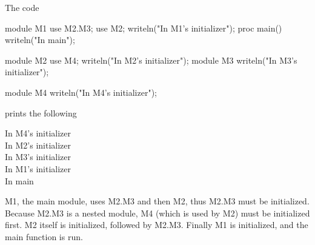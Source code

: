 \begin{example}
The code
\begin{chapelpre}
\end{chapelpre}
\begin{chapel}
module M1 {
  use M2.M3;
  use M2;
  writeln("In M1's initializer");
  proc main() {
    writeln("In main");
  }
}

module M2 {
  use M4;
  writeln("In M2's initializer");
  module M3 {
    writeln("In M3's initializer");
  }
}

module M4 {
  writeln("In M4's initializer");
}
\end{chapel}
prints the following
\begin{chapelprintoutput}
In M4's initializer\\
In M2's initializer\\
In M3's initializer\\
In M1's initializer\\
In main
\end{chapelprintoutput}
M1, the main module, uses M2.M3 and then M2, thus M2.M3 must be
initialized.  Because M2.M3 is a nested module, M4 (which is used by
M2) must be initialized first.  M2 itself is initialized, followed by
M2.M3.  Finally M1 is initialized, and the main function is run.
\end{example}
